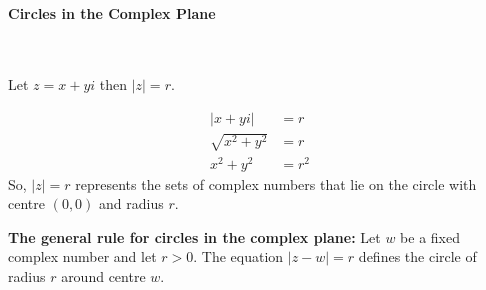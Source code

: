 \documentclass[a4paper]{article}
\begin{document}
				\paragraph{Circles in the Complex Plane}\mbox{} \\
					\begin{minipage}{0.5\textwidth}
						Let $z=x+yi$ then $|z|=r$.
					\end{minipage}
					\hfill
					\begin{minipage}{0.4\textwidth}
						\begin{align*}
							|x+yi|&=r \\
							\sqrt{x^2+y^2}&=r \\
							x^2+y^2&=r^2
						\end{align*}
						So, $|z|=r$ represents the sets of complex numbers that lie on the circle with centre $(0,0)$ and radius $r$.
					\end{minipage}
					\begin{minipage}{0.4\textwidth}
						\vspace{20pt}
						\textbf{The general rule for circles in the complex plane:}\newline
						Let $w$ be a fixed complex number and let $r>0$. The equation $|z-w|=r$ defines the circle of radius $r$ around centre $w$.
					\end{minipage}
					\hfill
					\begin{minipage}{0.6\textwidth}
						\vspace{20pt}
						\begin{flushright}
						\end{flushright}
					\end{minipage}
\end{document}
